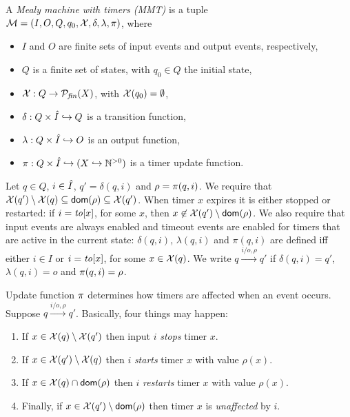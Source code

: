 \begin{definition}
\label{def:MMT}
A \emph{Mealy machine with timers (MMT)} is a tuple
\\
${\cal M} = (I, O, Q, q_0, \mathcal{X}, \delta, \lambda, \pi)$, where
\begin{itemize}
\item
$I$ and $O$ are finite sets of input events and output events, respectively,
\item
$Q$ is a finite set of states,
with
$q_0 \in Q$ the initial state,
\item
$\mathcal{X}: Q \rightarrow {\cal{P}}_{\mathit{fin}}(X)$, with $\mathcal{X}(q_0) = \emptyset$,
\item
$\delta: Q \times \hat{I} \hookrightarrow  Q$ is a transition function,
\item
$\lambda: Q \times \hat{I} \hookrightarrow O$ is an output function, 
\item
$\pi : Q \times \hat{I} \hookrightarrow (X \hookrightarrow {\mathbb N}^{>0})$ is a timer update function.
\end{itemize}
Let $q \in Q$, $i \in \hat{I}$, $q'=\delta(q,i)$ and $\rho=\pi(q,i)$. 
We require that $\mathcal{X}(q') \setminus \mathcal{X}(q) \subseteq {\textsf{dom}}(\rho) \subseteq\mathcal{X}(q')$. 
When timer $x$ expires it is either stopped or restarted:
if $i=\mathit{to}[x]$, for some $x$, then $x \not\in \mathcal{X}(q') \setminus {\textsf{dom}}(\rho)$.
%
We also require that input events are always enabled and timeout events are enabled
for timers that are active in the current state:
$\delta(q,i)$, $\lambda(q,i)$ and $\pi(q,i)$ are defined iff either
$i \in I$ or $i=\mathit{to}[x]$, for some $x \in\mathcal{X}(q)$.
We write $q \xrightarrow{i/o,\rho} q'$ if $\delta(q,i) = q'$, $\lambda(q,i)= o$ and $\pi(q,i) = \rho$.
\end{definition}
Update function $\pi$ determines how timers are affected when an event occurs. Suppose $q \xrightarrow{i/o,\rho} q'$.
Basically, four things may happen:
\begin{enumerate}
\item
If $x \in\mathcal{X}(q) \setminus \mathcal{X}(q')$ then input $i$ \emph{stops} timer $x$.
\item
If $x \in \mathcal{X}(q') \setminus \mathcal{X}(q)$ then $i$ \emph{starts} timer $x$ with value $\rho(x)$.
\item
If $x \in \mathcal{X}(q) \cap {\textsf{dom}}(\rho)$ then $i$ \emph{restarts} timer $x$ with value $\rho(x)$.
\item
Finally, if $x \in \mathcal{X}(q') \setminus {\textsf{dom}}(\rho)$ then timer $x$ is \emph{unaffected} by $i$.
\end{enumerate}

